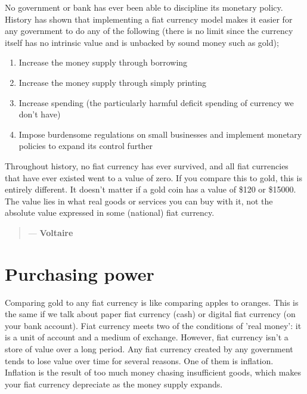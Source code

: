 No government or bank has ever been able to discipline its monetary policy. History has shown that implementing a fiat currency model makes it easier for any government to do any of the following (there is no limit since the currency itself has no intrinsic value and is unbacked by sound money such as gold);

\begin{enumerate}[label=(\alph*)]
    \setlength\itemsep{0em}
    \item Increase the money supply through borrowing
    \item Increase the money supply through simply printing
    \item Increase spending (the particularly harmful deficit spending of currency we don't have)
    \item Impose burdensome regulations on small businesses and implement monetary policies to expand its control further
\end{enumerate}

\noindent Throughout history, no fiat currency has ever survived, and all fiat currencies that have ever existed went to a value of zero\cite{fiattozero1, fiattozero2}. If you compare this to gold, this is entirely different. It doesn't matter if a gold coin has a value of \$120 or \$15000. The value lies in what real goods or services you can buy with it, not the absolute value expressed in some (national) fiat currency.

\begin{quotation}

      \textit{}
      \begin{flushright}
        \small{--- \textbf{Voltaire}}
      \end{flushright}
    
\end{quotation}

\section{Purchasing power}
Comparing gold to any fiat currency is like comparing apples to oranges. This is the same if we talk about paper fiat currency (cash) or digital fiat currency (on your bank account).  Fiat currency meets two of the conditions of 'real money': it is a unit of account and a medium of exchange. However, fiat currency isn't a store of value over a long period.  Any fiat currency created by any government tends to lose value over time for several reasons. One of them is inflation. Inflation is the result of too much money chasing insufficient goods, which makes your fiat currency depreciate as the money supply expands. 

